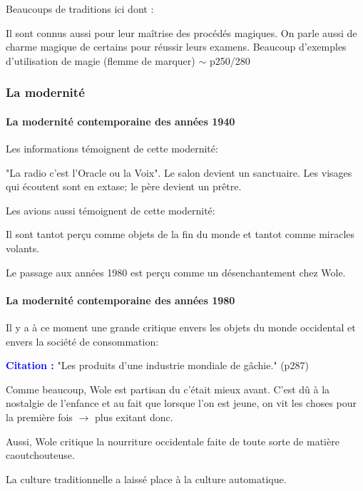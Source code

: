 \documentclass[a4paper, 11pt, hidelinks]{article}
\newcommand{\bs}{\bigskip}
\newcommand{\cit}{\large \textcolor{blue}{\textbf{Citation :}} \large }
\begin{document}
Beaucoups de traditions ici dont :


Il sont connus aussi pour leur maîtrise des procédés magiques. On parle aussi de charme magique de certains pour réussir
leurs examens. Beaucoup d'exemples d'utilisation de magie (flemme de marquer) $\sim$ p250/280



\subsubsection{La modernité}



\paragraph{La modernité contemporaine des années 1940}

Les informations témoignent de cette modernité:

"La radio c'est l'Oracle ou la Voix". Le salon devient un sanctuaire. Les visages qui écoutent sont en extase;
le père devient un prêtre.
\bs



Les avions aussi témoignent de cette modernité:

Il sont tantot perçu comme objets de la fin du monde et tantot comme miracles volants.


Le passage aux années 1980 est perçu comme un désenchantement chez Wole.




\paragraph{La modernité contemporaine des années 1980}


Il y a à ce moment une grande critique envers les objets du monde occidental et envers la société de consommation:

\cit "Les produits d'une industrie mondiale de gâchie." (p287)

\bs

Comme beaucoup, Wole est partisan du c'était mieux avant. C'est dû à la nostalgie de l'enfance et au fait que 
lorsque l'on est jeune, on vit les choses pour la première fois $\to$ plus exitant donc.
\bs


Aussi, Wole critique la nourriture occidentale faite de toute sorte de matière caoutchouteuse.
\bs

La culture traditionnelle a laissé place à la culture automatique.
\end{document}
